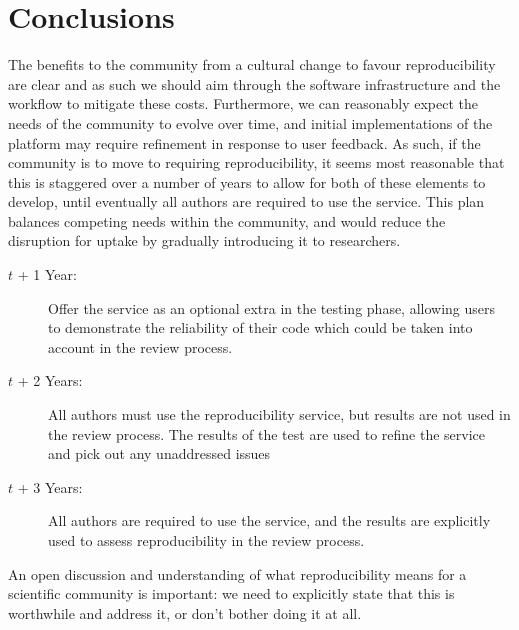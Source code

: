 \documentclass[conference]{IEEEtran}
\begin{document}
\section{Conclusions}\label{concl}

The benefits to the community from a cultural change to favour
reproducibility are clear and as such we should aim through the
software infrastructure and the workflow to mitigate these
costs. Furthermore, we can reasonably expect the needs of the
community to evolve over time, and initial implementations of the
platform may require refinement in response to user feedback. As such,
if the community is to move to requiring reproducibility, it seems
most reasonable that this is staggered over a number of years to allow
for both of these elements to develop, until eventually all authors
are required to use the service. This plan balances competing needs
within the community, and would reduce the disruption for uptake by
gradually introducing it to researchers.

\begin{description}
\item[$t$ + 1 Year:] Offer the service as an optional extra in the
  testing phase, allowing users to demonstrate the reliability of
  their code which could be taken into account in the review process.
\item[$t$ + 2 Years:] All authors must use the reproducibility
  service, but results are not used in the review process. The results
  of the test are used to refine the service and pick out any
  unaddressed issues
\item[$t$ + 3 Years:] All authors are required to use the service, and
  the results are explicitly used to assess reproducibility in the
  review process.
\end{description}

An open discussion and understanding of what reproducibility means for
a scientific community is important: we need to explicitly state that
this is worthwhile and address it, or don't bother doing it at all. 







\end{document}
